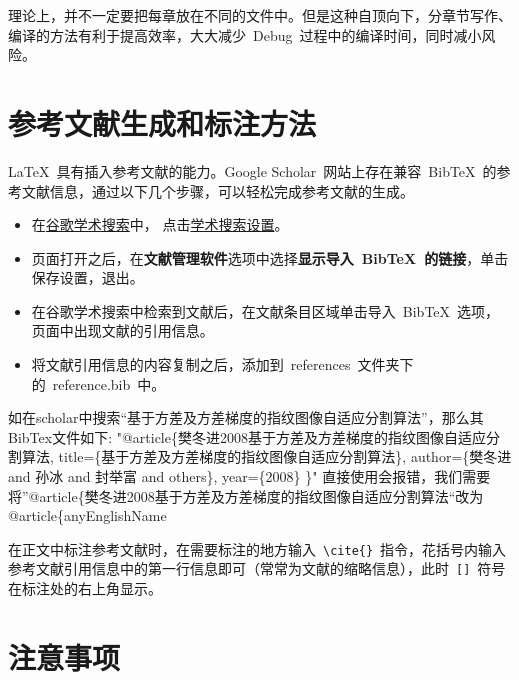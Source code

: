 理论上，并不一定要把每章放在不同的文件中。但是这种自顶向下，分章节写作、编译的方法有利于提高效率，大大减少~Debug~过程中的编译时间，同时减小风险。

\section{参考文献生成和标注方法}

\LaTeX~具有插入参考文献的能力。Google Scholar~网站上存在兼容~BibTeX~的参考文献信息，通过以下几个步骤，可以轻松完成参考文献的生成。
\begin{itemize}
  \item 在\href{http://scholar.google.com/}{谷歌学术搜索}中，
        点击\href{http://scholar.google.com/scholar_preferences?hl=en&as_sdt=0,5}{学术搜索设置}。
  \item 页面打开之后，在\textbf{文献管理软件}选项中选择\textbf{显示导入~BibTeX~的链接}，单击保存设置，退出。
  \item 在谷歌学术搜索中检索到文献后，在文献条目区域单击导入~BibTeX~选项，页面中出现文献的引用信息。
  \item 将文献引用信息的内容复制之后，添加到~references~文件夹下的~reference.bib~中。
\end{itemize}
\par{如在scholar中搜索“基于方差及方差梯度的指纹图像自适应分割算法”，那么其BibTex文件如下:
 "@article\{樊冬进2008基于方差及方差梯度的指纹图像自适应分割算法,
  title=\{基于方差及方差梯度的指纹图像自适应分割算法\},
  author=\{樊冬进 and 孙冰 and 封举富 and others\},
  year=\{2008\}
\}"
直接使用会报错，我们需要将”@article\{樊冬进2008基于方差及方差梯度的指纹图像自适应分割算法“改为@article\{anyEnglishName

}


在正文中标注参考文献时，在需要标注的地方输入~\verb|\cite{}|~指令，花括号内输入参考文献引用信息中的第一行信息即可（常常为文献的缩略信息），此时~\verb|[]|~符号在标注处的右上角显示。

\section{注意事项}

